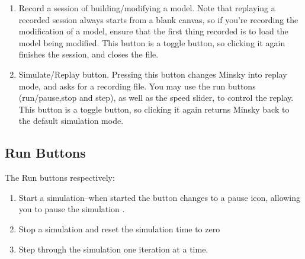 \begin{enumerate}
  \item Record a session of building/modifying a model. Note that
    replaying a recorded session always starts from a blank canvas, so
    if you're recording the modification of a model, ensure that the
    first thing recorded is to load the model being modified. This
    button is a toggle button, so clicking it again finishes the
    session, and closes the file.
  \item Simulate/Replay button. Pressing this button changes Minsky
    into replay mode, and asks for a recording file. You may use the
    run buttons (run/pause,stop and step), as well as the speed
    slider, to control the replay. This button is a toggle button, so
    clicking it again returns Minsky back to the default simulation
    mode.
\end{enumerate}

\subsection{Run Buttons}
\label{RunButtons}


The Run buttons respectively:
\begin{enumerate}
\item    Start a simulation--when started the button changes to a pause icon,
allowing you to pause the simulation .
\item Stop a simulation and reset the simulation time to zero
\item Step through the simulation one iteration at a time.
\end{enumerate}

%

